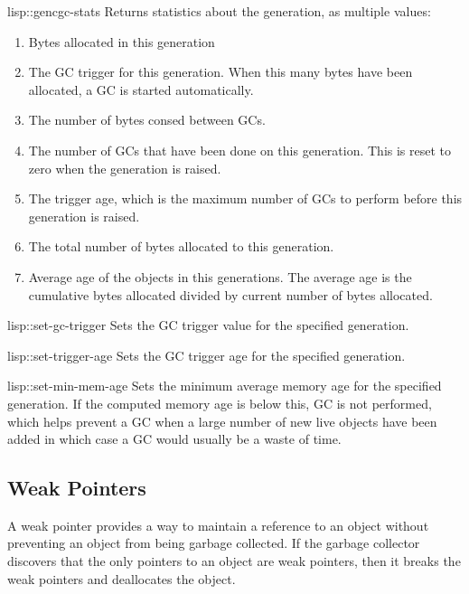 \begin{defun}{lisp::}{gencgc-stats}{}
  Returns statistics about the generation, as multiple values:
  \begin{enumerate}
  \item Bytes allocated in this generation
  \item The GC trigger for this generation.  When this many bytes have
    been allocated, a GC is started automatically.
  \item The number of bytes consed between GCs.
  \item The number of GCs that have been done on this generation.
    This is reset to zero when the generation is raised.
  \item The trigger age, which is the maximum number of GCs to perform
    before this generation is raised.
  \item The total number of bytes allocated to this generation.
  \item Average age of the objects in this generations.  The average
    age is the cumulative bytes allocated divided by current number of
    bytes allocated.
  \end{enumerate}
\end{defun}

\begin{defun}{lisp::}{set-gc-trigger}{}
  Sets the GC trigger value for the specified generation.
\end{defun}

\begin{defun}{lisp::}{set-trigger-age}{}
  Sets the GC trigger age for the specified generation.
\end{defun}

\begin{defun}{lisp::}{set-min-mem-age}{}
  Sets the minimum average memory age for the specified generation.
  If the computed memory age is below this, GC is not performed, which
  helps prevent a GC when a large number of new live objects have been
  added in which case a GC would usually be a waste of time.
\end{defun}

\subsection{Weak Pointers}

A weak pointer provides a way to maintain a reference to an object
without preventing an object from being garbage collected.  If the
garbage collector discovers that the only pointers to an object are
weak pointers, then it breaks the weak pointers and deallocates the
object.

